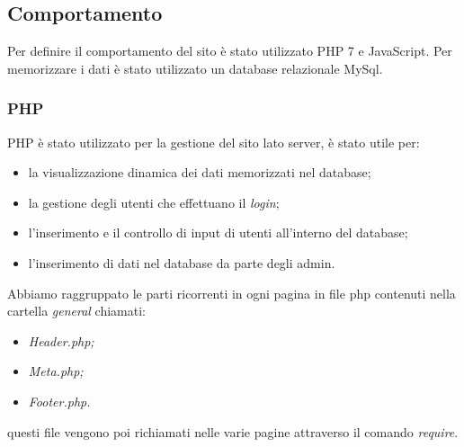 \subsection{Comportamento}
Per definire il comportamento del sito è stato utilizzato PHP 7 e JavaScript. \newline
Per memorizzare i dati è stato utilizzato un database relazionale MySql.
\subsubsection{PHP}
PHP è stato utilizzato per la gestione del sito lato server, è stato utile per: 
\begin{itemize}
    \item la visualizzazione dinamica dei dati memorizzati nel database;
    \item la gestione degli utenti che effettuano il \emph{login};
    \item l'inserimento e il controllo di input di utenti all'interno del database;
    \item l'inserimento di dati nel database da parte degli admin.
\end{itemize}
Abbiamo raggruppato le parti ricorrenti in ogni pagina in file php contenuti nella cartella \emph{general} chiamati:
\begin{itemize}
	\item \textit{Header.php;}
	\item \textit{Meta.php;}
	\item \textit{Footer.php.}
\end{itemize}
questi file vengono poi richiamati nelle varie pagine attraverso il comando \emph{require}.\newline

